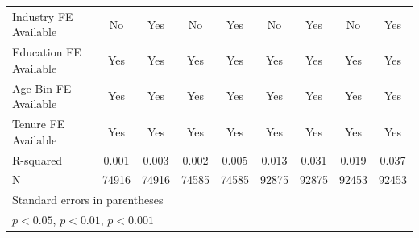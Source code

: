 {\begin{tabular}{l*{4}{c}|*{4}{c}}
Industry FE Available&          No         &         Yes         &          No         &         Yes         &          No         &         Yes         &          No         &         Yes         \\
Education FE Available&         Yes         &         Yes         &         Yes         &         Yes         &         Yes         &         Yes         &         Yes         &         Yes         \\
Age Bin FE Available&         Yes         &         Yes         &         Yes         &         Yes         &         Yes         &         Yes         &         Yes         &         Yes         \\
Tenure FE Available &         Yes         &         Yes         &         Yes         &         Yes         &         Yes         &         Yes         &         Yes         &         Yes         \\
R-squared           &       0.001         &       0.003         &       0.002         &       0.005         &       0.013         &       0.031         &       0.019         &       0.037         \\
N                   &       74916         &       74916         &       74585         &       74585         &       92875         &       92875         &       92453         &       92453         \\
\hline\hline
\multicolumn{9}{l}{\footnotesize Standard errors in parentheses}\\
\multicolumn{9}{l}{\footnotesize \sym{*} \(p<0.05\), \sym{**} \(p<0.01\), \sym{***} \(p<0.001\)}\\
\end{tabular}
}
